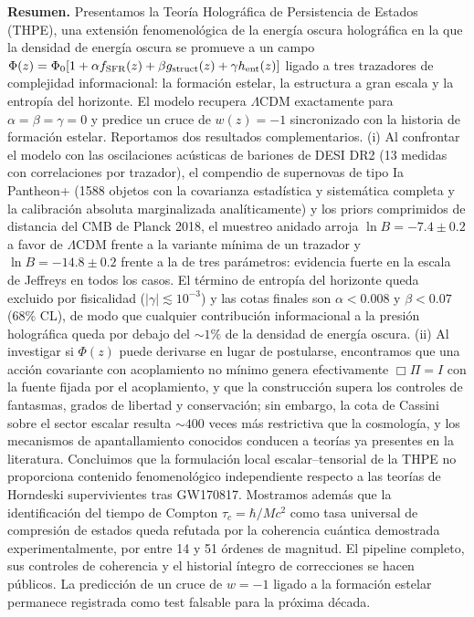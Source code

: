 \documentclass[aps,prd,twocolumn,superscriptaddress,nofootinbib,floatfix]{revtex4-2}
\newcommand{\LCDM}{\ensuremath{\Lambda}CDM}
\begin{document}
\begin{center}
\begin{minipage}{0.95\columnwidth}
\small
\textbf{Resumen.} Presentamos la Teor\'ia Hologr\'afica de Persistencia
de Estados (THPE), una extensi\'on fenomenol\'ogica de la energ\'ia
oscura hologr\'afica en la que la densidad de energ\'ia oscura se
promueve a un campo
$\Phi(z)=\Phi_0[1+\alpha f_{\rm SFR}(z)+\beta g_{\rm struct}(z)+\gamma
h_{\rm ent}(z)]$ ligado a tres trazadores de complejidad informacional:
la formaci\'on estelar, la estructura a gran escala y la entrop\'ia del
horizonte. El modelo recupera \LCDM{} exactamente para
$\alpha=\beta=\gamma=0$ y predice un cruce de $w(z)=-1$ sincronizado
con la historia de formaci\'on estelar. Reportamos dos resultados
complementarios. (i) Al confrontar el modelo con las oscilaciones
ac\'usticas de bariones de DESI DR2 (13 medidas con correlaciones por
trazador), el compendio de supernovas de tipo Ia Pantheon+ (1588
objetos con la covarianza estad\'istica y sistem\'atica completa y la
calibraci\'on absoluta marginalizada anal\'iticamente) y los priors
comprimidos de distancia del CMB de Planck 2018, el muestreo anidado
arroja $\ln B=-7.4\pm0.2$ a favor de \LCDM{} frente a la variante
m\'inima de un trazador y $\ln B=-14.8\pm0.2$ frente a la de tres
par\'ametros: evidencia fuerte en la escala de Jeffreys en todos los
casos. El t\'ermino de entrop\'ia del horizonte queda excluido por
fisicalidad ($|\gamma|\lesssim10^{-3}$) y las cotas finales son
$\alpha<0.008$ y $\beta<0.07$ (68\% CL), de modo que cualquier
contribuci\'on informacional a la presi\'on hologr\'afica queda por
debajo del $\sim1\%$ de la densidad de energ\'ia oscura.
(ii) Al investigar si $\Phi(z)$ puede derivarse en lugar de postularse,
encontramos que una acci\'on covariante con acoplamiento no m\'inimo
genera efectivamente $\Box\Pi=I$ con la fuente fijada por el
acoplamiento, y que la construcci\'on supera los controles de
fantasmas, grados de libertad y conservaci\'on; sin embargo, la cota de
Cassini sobre el sector escalar resulta $\sim400$ veces m\'as
restrictiva que la cosmolog\'ia, y los mecanismos de apantallamiento
conocidos conducen a teor\'ias ya presentes en la literatura.
Concluimos que la formulaci\'on local escalar--tensorial de la THPE no
proporciona contenido fenomenol\'ogico independiente respecto a las
teor\'ias de Horndeski supervivientes tras GW170817. Mostramos adem\'as
que la identificaci\'on del tiempo de Compton $\tau_c=\hbar/Mc^2$ como
tasa universal de compresi\'on de estados queda refutada por la
coherencia cu\'antica demostrada experimentalmente, por entre 14 y 51
\'ordenes de magnitud. El pipeline completo, sus controles de
coherencia y el historial \'integro de correcciones se hacen p\'ublicos.
La predicci\'on de un cruce de $w=-1$ ligado a la formaci\'on estelar
permanece registrada como test falsable para la pr\'oxima d\'ecada.
\end{minipage}
\end{center}
\end{document}
